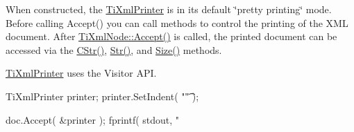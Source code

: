 When constructed, the \hyperlink{class_ti_xml_printer}{Ti\+Xml\+Printer} is in its default \char`\"{}pretty printing\char`\"{} mode. Before calling Accept() you can call methods to control the printing of the X\+M\+L document. After \hyperlink{class_ti_xml_node_acc0f88b7462c6cb73809d410a4f5bb86}{Ti\+Xml\+Node\+::\+Accept()} is called, the printed document can be accessed via the \hyperlink{class_ti_xml_printer_a859eede9597d3e0355b77757be48735e}{C\+Str()}, \hyperlink{class_ti_xml_printer_a3bd4daf44309b41f5813a833caa0d1c9}{Str()}, and \hyperlink{class_ti_xml_printer_ad01375ae9199bd2f48252eaddce3039d}{Size()} methods.

\hyperlink{class_ti_xml_printer}{Ti\+Xml\+Printer} uses the Visitor A\+P\+I. \begin{DoxyVerb}TiXmlPrinter printer;
printer.SetIndent( "\t" );

doc.Accept( &printer );
fprintf( stdout, "%
\end{DoxyVerb}
 

